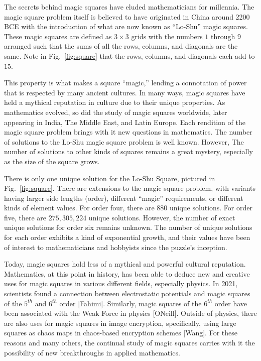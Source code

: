 \documentclass[12pt]{report}
\begin{document}
\par The secrets behind magic squares have eluded mathematicians for millennia. The magic square
problem itself is believed to have originated in China around 2200 BCE with the introduction of
what are now known as “Lo-Shu” magic squares. These magic squares are defined as $3\times3$ grids
with the numbers $1$ through $9$ arranged such that the sums of all the rows, columns, and
diagonals are the same. Note in Fig.~\ref{fig:square} that the rows, columns, and diagonals each
add to $15$.

\par This property is what makes a square ``magic,'' lending a connotation of power that is
respected by many ancient cultures. In many ways, magic squares have held a mythical reputation in
culture due to their unique properties. As mathematics evolved, so did the study of magic squares
worldwide, later appearing in India, The Middle East, and Latin Europe. Each rendition of the magic
square problem brings with it new questions in mathematics. The number of solutions to the Lo-Shu
magic square problem is well known. However, The number of solutions to other kinds of squares
remains a great mystery, especially as the size of the square grows.

\par There is only one unique solution for the Lo-Shu Square, pictured in Fig.~\ref{fig:square}.
There are extensions to the magic square problem, with variants having larger side lengths (order),
different ``magic'' requirements, or different kinds of element values. For order four, there are
$880$ unique solutions. For order five, there are $275,305,224$ unique solutions. However, the
number of exact unique solutions for order six remains unknown. The number of unique solutions for
each order exhibits a kind of exponential growth, and their values have been of interest to
mathematicians and hobbyists since the puzzle's inception.

\par Today, magic squares hold less of a mythical and powerful cultural reputation. Mathematics, at
this point in history, has been able to deduce new and creative uses for magic squares in various
different fields, especially physics. In 2021, scientists found a connection between electrostatic
potentials and magic squares of the $5^{th}$ and $6^{th}$ order [Fahimi]. Similarly, magic squares
of the $6^{th}$ order have been associated with the Weak Force in physics [ONeill]. Outside of
physics, there are also uses for magic squares in image encryption, specifically, using large
squares as chaos maps in chaos-based encryption schemes [Wang]. For these reasons and many others,
the continual study of magic squares carries with it the possibility of new breakthroughs in
applied mathematics.
\end{document}
